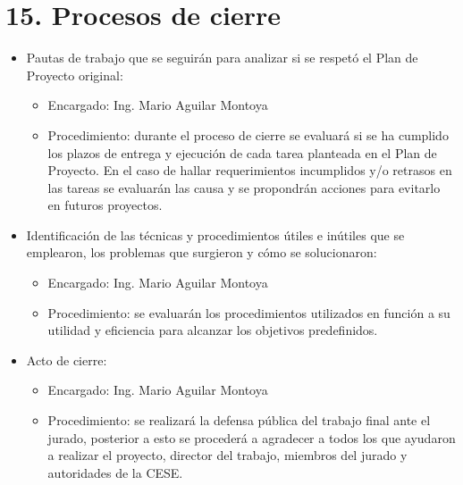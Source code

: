 \documentclass[
11pt, %
codirector, %
]{charter}
\begin{document}
\section{15. Procesos de cierre}    
\label{sec:cierre}

\begin{itemize}
	\item Pautas de trabajo que se seguirán para analizar si se respetó el Plan de Proyecto original:
	\begin{itemize}
		\item Encargado: Ing. Mario Aguilar Montoya
		\item Procedimiento: durante el proceso de cierre se evaluará si se ha cumplido los plazos
		de entrega y ejecución de cada tarea planteada en el Plan de Proyecto. En el caso de hallar requerimientos incumplidos y/o retrasos en las
		tareas se evaluarán las causa y se propondrán acciones para evitarlo en futuros
		proyectos.
	\end{itemize}
	\item Identificación de las técnicas y procedimientos útiles e inútiles que se emplearon, los problemas que surgieron y cómo se solucionaron:
	\begin{itemize}
		\item Encargado: Ing. Mario Aguilar Montoya
		\item Procedimiento: se evaluarán los procedimientos utilizados en función a su utilidad
		y eficiencia para alcanzar los objetivos predefinidos.
	\end{itemize}
	\item Acto de cierre:
	\begin{itemize}
		\item Encargado: Ing. Mario Aguilar Montoya
		\item Procedimiento: se realizará la defensa pública del trabajo final ante el jurado, posterior a esto se
		procederá a agradecer a todos los que ayudaron a realizar el proyecto, director del
		trabajo, miembros del jurado y autoridades de la CESE.
	\end{itemize}
\end{itemize}
\end{document}
